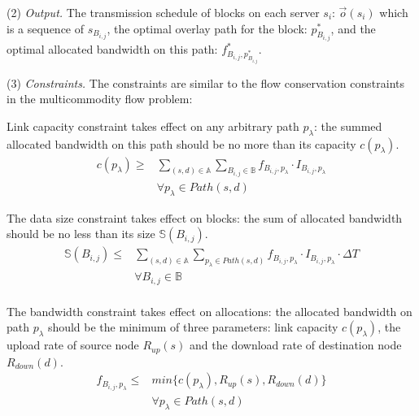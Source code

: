 \noindent(2) {\em Output.}
The transmission schedule of blocks on each server $s_i$:
$\overrightarrow{o}(s_i)$ which is a sequence of
$s_{B_{i,j}}$,
the optimal overlay path for the block:
$p_{B_{i,j}}^*$,
and the optimal allocated bandwidth on this path:
$f^*_{B_{i,j},p_{B_{i,j}}^*}$.

\noindent(3) {\em Constraints.}
The constraints are similar to the flow conservation
constraints in the multicommodity flow problem:


Link capacity constraint takes effect on any arbitrary path $p_\lambda$: the summed allocated bandwidth on this path should be no more than its capacity $c(p_\lambda)$.
\begin{equation}
\begin{split}
c(p_\lambda) \geq & \displaystyle{\sum_{(s,d)\in \mathbb{A}}} \displaystyle{\sum_{B_{i,j} \in \mathbb{B}}} f_{B_{i,j},p_\lambda} \cdot I_{B_{i,j},p_\lambda}\\
& \forall p_\lambda \in Path(s,d) \label{st:capacity}
\end{split}
\end{equation}

The data size constraint takes effect on blocks: the sum of allocated bandwidth should be no less than its size $\mathbb{S}(B_{i,j})$.
\begin{equation}
\begin{split}
\mathbb{S}(B_{i,j}) \leq & \displaystyle{\sum_{(s,d)\in \mathbb{A}}} \displaystyle{\sum_{p_{\lambda}\in Path(s,d)}} f_{B_{i,j},p_\lambda} \cdot I_{B_{i,j},p_\lambda} \cdot \Delta T\\
& \forall B_{i,j} \in \mathbb{B} \label{st:size}\\
\end{split}
\end{equation}

The bandwidth constraint takes effect on allocations: the allocated bandwidth on path $p_\lambda$ should be the minimum of three parameters: link capacity $c(p_\lambda)$, the upload rate of source node $R_{up}(s)$ and the download rate of destination node $R_{down}(d)$.
\begin{equation}
\begin{split}
f_{B_{i,j},p_\lambda} \leq & min \{c(p_\lambda),R_{up}(s),R_{down}(d)\}\\
& \forall p_\lambda \in Path(s,d) \label{st:bottleneck}
\end{split}
\end{equation}

